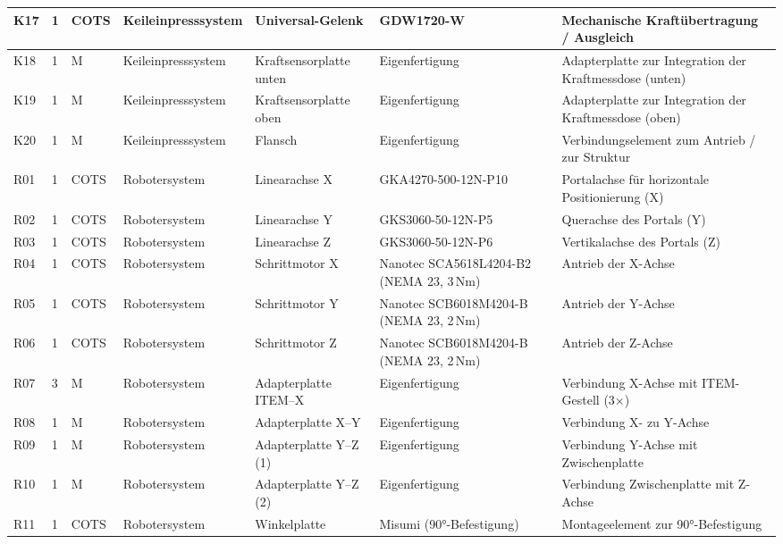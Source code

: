 \begin{landscape}
{\begin{longtable}{|l|l|l|l|l|p{4.6cm}|p{6.5cm}|}
\hline
K17 & 1 & COTS & Keileinpresssystem & Universal-Gelenk & GDW1720-W & Mechanische Kraftübertragung / Ausgleich \\
\hline
K18 & 1 & M & Keileinpresssystem & Kraftsensorplatte unten & Eigenfertigung & Adapterplatte zur Integration der Kraftmessdose (unten) \\
\hline
K19 & 1 & M & Keileinpresssystem & Kraftsensorplatte oben & Eigenfertigung & Adapterplatte zur Integration der Kraftmessdose (oben) \\
\hline
K20 & 1 & M & Keileinpresssystem & Flansch & Eigenfertigung & Verbindungselement zum Antrieb / zur Struktur \\
\hline

R01 & 1 & COTS & Robotersystem & Linearachse X & GKA4270-500-12N-P10 & Portalachse für horizontale Positionierung (X) \\
\hline
R02 & 1 & COTS & Robotersystem & Linearachse Y & GKS3060-50-12N-P5 & Querachse des Portals (Y) \\
\hline
R03 & 1 & COTS & Robotersystem & Linearachse Z & GKS3060-50-12N-P6 & Vertikalachse des Portals (Z) \\
\hline
R04 & 1 & COTS & Robotersystem & Schrittmotor X & Nanotec SCA5618L4204-B2 (NEMA 23, 3\,Nm) & Antrieb der X-Achse \\
\hline
R05 & 1 & COTS & Robotersystem & Schrittmotor Y & Nanotec SCB6018M4204-B (NEMA 23, 2\,Nm) & Antrieb der Y-Achse \\
\hline
R06 & 1 & COTS & Robotersystem & Schrittmotor Z & Nanotec SCB6018M4204-B (NEMA 23, 2\,Nm) & Antrieb der Z-Achse \\
\hline
R07 & 3 & M & Robotersystem & Adapterplatte ITEM–X & Eigenfertigung & Verbindung X-Achse mit ITEM-Gestell (3×) \\
\hline
R08 & 1 & M & Robotersystem & Adapterplatte X–Y & Eigenfertigung & Verbindung X- zu Y-Achse \\
\hline
R09 & 1 & M & Robotersystem & Adapterplatte Y–Z (1) & Eigenfertigung & Verbindung Y-Achse mit Zwischenplatte \\
\hline
R10 & 1 & M & Robotersystem & Adapterplatte Y–Z (2) & Eigenfertigung & Verbindung Zwischenplatte mit Z-Achse \\
\hline
R11 & 1 & COTS & Robotersystem & Winkelplatte & Misumi (90°-Befestigung) & Montageelement zur 90°-Befestigung \\
\hline


\end{longtable}}
\end{landscape}
